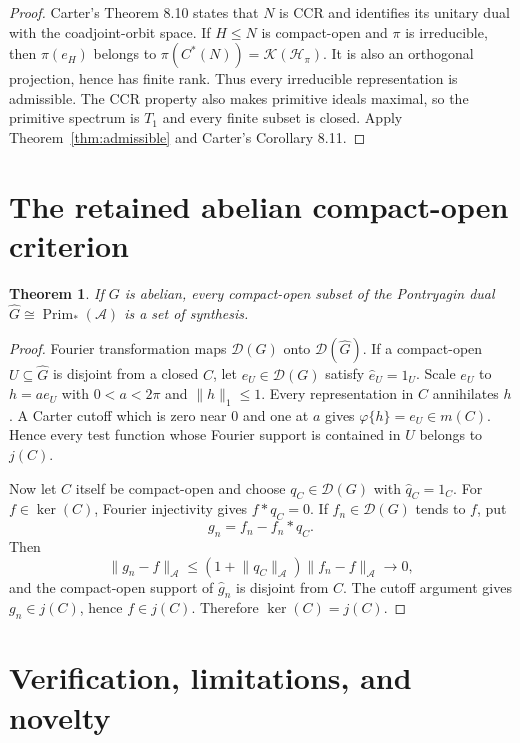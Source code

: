 \documentclass[11pt]{article}
\newtheorem{theorem}{Theorem}
\newcommand{\A}{\mathcal A}
\newcommand{\D}{\mathcal D}
\newcommand{\Prim}{\operatorname{Prim}}
\begin{document}
\begin{proof}
Carter's Theorem 8.10 states that $N$ is CCR and identifies its unitary dual
with the coadjoint-orbit space.  If $H\leq N$ is compact-open and $\pi$ is
irreducible, then $\pi(e_H)$ belongs to
$\pi(C^*(N))=\mathcal K(\mathcal H_\pi)$.  It is also an orthogonal
projection, hence has finite rank.  Thus every irreducible representation is
admissible.  The CCR property also makes primitive ideals maximal, so the
primitive spectrum is $T_1$ and every finite subset is closed.  Apply
Theorem~\ref{thm:admissible} and Carter's Corollary 8.11.
\end{proof}

\section{The retained abelian compact-open criterion}

\begin{theorem}\label{thm:compactopen}
If $G$ is abelian, every compact-open subset of the Pontryagin dual
$\widehat G\cong\Prim_*(\A)$ is a set of synthesis.
\end{theorem}

\begin{proof}
Fourier transformation maps $\D(G)$ onto $\D(\widehat G)$.  If a compact-open
$U\subseteq\widehat G$ is disjoint from a closed $C$, let
$e_U\in\D(G)$ satisfy $\widehat e_U=1_U$.  Scale $e_U$ to $h=ae_U$ with
$0<a<2\pi$ and $\lVert h\rVert_1\leq1$.  Every representation in $C$
annihilates $h$.  A Carter cutoff which is zero near $0$ and one at $a$ gives
$\varphi\{h\}=e_U\in m(C)$.  Hence every test function whose Fourier support
is contained in $U$ belongs to $j(C)$.

Now let $C$ itself be compact-open and choose $q_C\in\D(G)$ with
$\widehat q_C=1_C$.  For $f\in\ker(C)$, Fourier injectivity gives
$f*q_C=0$.  If $f_n\in\D(G)$ tends to $f$, put
\[
 g_n=f_n-f_n*q_C.
\]
Then
\[
 \lVert g_n-f\rVert_\A
 \leq(1+\lVert q_C\rVert_\A)\lVert f_n-f\rVert_\A\longrightarrow0,
\]
and the compact-open support of $\widehat g_n$ is disjoint from $C$.
The cutoff argument gives $g_n\in j(C)$, hence $f\in j(C)$.  Therefore
$\ker(C)=j(C)$.
\end{proof}

\section{Verification, limitations, and novelty}
\end{document}
